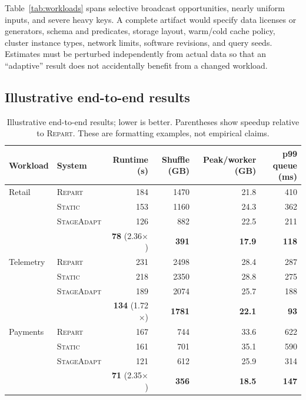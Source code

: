 Table~\ref{tab:workloads} spans selective broadcast opportunities, nearly
uniform inputs, and severe heavy keys.  A complete artifact would specify data
licenses or generators, schema and predicates, storage layout, warm/cold cache
policy, cluster instance types, network limits, software revisions, and query
seeds.  Estimates must be perturbed independently from actual data so that an
``adaptive'' result does not accidentally benefit from a changed workload.

\subsection{Illustrative end-to-end results}

\begin{table}[t]
  \caption{Illustrative end-to-end results; lower is better.  Parentheses show
  speedup relative to \textsc{Repart}.  These are formatting examples, not
  empirical claims.}
  \label{tab:main-results}
  \centering
  \small
  \begin{tabular}{@{}llrrrr@{}}
    \toprule
    Workload & System & Runtime (s) & Shuffle (GB) & Peak/worker (GB) & p99 queue (ms) \\
    \midrule
    Retail
      & \textsc{Repart}     & 184 & 1470 & 21.8 & 410 \\
      & \textsc{Static}     & 153 & 1160 & 24.3 & 362 \\
      & \textsc{StageAdapt} & 126 &  882 & 22.5 & 211 \\
      & \system{}           &  \textbf{78} (2.36$\times$) & \textbf{391} & \textbf{17.9} & \textbf{118} \\
    \addlinespace
    Telemetry
      & \textsc{Repart}     & 231 & 2498 & 28.4 & 287 \\
      & \textsc{Static}     & 218 & 2350 & 28.8 & 275 \\
      & \textsc{StageAdapt} & 189 & 2074 & 25.7 & 188 \\
      & \system{}           & \textbf{134} (1.72$\times$) & \textbf{1781} & \textbf{22.1} & \textbf{93} \\
    \addlinespace
    Payments
      & \textsc{Repart}     & 167 &  744 & 33.6 & 622 \\
      & \textsc{Static}     & 161 &  701 & 35.1 & 590 \\
      & \textsc{StageAdapt} & 121 &  612 & 25.9 & 314 \\
      & \system{}           &  \textbf{71} (2.35$\times$) & \textbf{356} & \textbf{18.5} & \textbf{147} \\
    \bottomrule
  \end{tabular}
\end{table}

